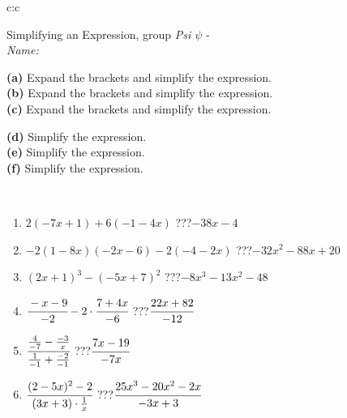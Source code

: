 \documentclass[10pt]{report}
\begin{document}
\newpage
\thispagestyle{empty}
\begin{tabular}{c:c}
\begin{minipage}[c][104.5mm][t]{0.5\linewidth}
\begin{center}
\vspace{7mm}
{\huge Simplifying an Expression, group \textit{Psi $\psi$} -}\\[5mm]
\textit{Name:}\phantom{xxxxxxxxxxxxxxxxxxxxxxxxxxxxxxxxxxxxxxxxxxxxxxxxxxxxxxxxxxxxxxxxx}\\[5mm]
\begin{minipage}{0.95\linewidth}
\begin{center}
{\small \begin{minipage}{0.6\textwidth}
\textbf{(a)} Expand the brackets and simplify the expression. \\[1mm]
\textbf{(b)} Expand the brackets and simplify the expression. \\[1mm]
\textbf{(c)} Expand the brackets and simplify the expression.
\end{minipage} \begin{minipage}{0.39\textwidth}
\textbf{(d)} Simplify the expression. \\[1mm]
\textbf{(e)} Simplify the expression. \\[1mm]
\textbf{(f)} Simplify the expression.
\end{minipage}
}
\end{center}
\end{minipage}
\\[4mm]
\begin{minipage}{0.79\linewidth}
\begin{center}
\begin{varwidth}{\linewidth}
\begin{enumerate}
\normalsize
\item $2(-7x+1)+6(-1-4x)$\quad \dotfill\; ???\;\dotfill \quad $-38x-4$
\item $-2(1-8x)(-2x-6)-2(-4-2x)$\quad \dotfill\; ???\;\dotfill \quad $-32x^2-88x+20$
\item $(2x+1)^3-(-5x+7)^2$\quad \dotfill\; ???\;\dotfill \quad $-8x^3-13x^2-48$
\item $\cfrac{-x-9}{-2}-2\cdot\cfrac{7+4x}{-6}$\quad \dotfill\; ???\;\dotfill \quad $\cfrac{22x+82}{-12}$
\item $\cfrac{\frac{4}{-7}-\frac{-3}{x}}{\frac{1}{-1}+\frac{-2}{-1}}$\quad \dotfill\; ???\;\dotfill \quad $\cfrac{7x-19}{-7x}$
\item $\cfrac{(2-5x)^2-2}{(3x+3)\cdot\frac{1}{x}}$\quad \dotfill\; ???\;\dotfill \quad $\cfrac{25x^3-20x^2-2x}{-3x+3}$

\end{enumerate}
\end{varwidth}
\end{center}
\end{minipage}
\end{center}
\end{minipage}
\end{tabular}
\end{document}
